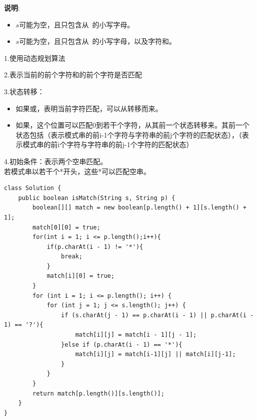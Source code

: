 \documentclass[30pt]{article}
\begin{document}
\textbf{说明}:
\begin{itemize}
\itemsep=0pt \parskip=0pt
\item $s$可能为空，且只包含从 的小写字母。
\item $s$可能为空，且只包含从 的小写字母，以及字符和\dm{*}。
\end{itemize}

\begin{tips}
1.使用动态规划算法

2.表示当前的前个字符和的前个字符是否匹配

3.状态转移：
\begin{itemize}
  \item 如果或，表明当前字符匹配，可以从转移而来。
  \item 如果，这个位置可以匹配0到若干个字符，从其前一个状态转移来。其前一个状态包括（表示模式串的前i-1个字符与字符串的前j个字符的匹配状态），（表示模式串的前i个字符与字符串的前j-1个字符的匹配状态）
\end{itemize}

4.初始条件：表示两个空串匹配。
\\ 若模式串以若干个*开头，这些*可以匹配空串。
\end{tips}

\begin{lstlisting}[title=通配符匹配]
class Solution {
    public boolean isMatch(String s, String p) {
        boolean[][] match = new boolean[p.length() + 1][s.length() + 1];
        match[0][0] = true;
        for(int i = 1; i <= p.length();i++){
            if(p.charAt(i - 1) != '*'){
                break;
            }
            match[i][0] = true;
        }
        for (int i = 1; i <= p.length(); i++) {
            for (int j = 1; j <= s.length(); j++) {
                if (s.charAt(j - 1) == p.charAt(i - 1) || p.charAt(i - 1) == '?'){
                    match[i][j] = match[i - 1][j - 1];
                }else if (p.charAt(i - 1) == '*'){
                    match[i][j] = match[i-1][j] || match[i][j-1];
                }
            }
        }
        return match[p.length()][s.length()];
    }
}
\end{lstlisting}
\end{document}
